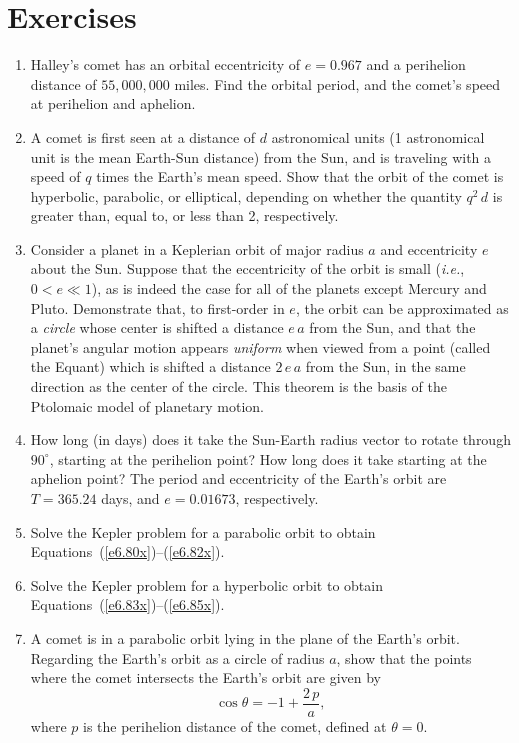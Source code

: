 \section{Exercises}
{\small
\renewcommand{\theenumi}{5.\arabic{enumi}}
\begin{enumerate}
\item Halley's comet has an orbital eccentricity of $e=0.967$ and a perihelion
distance of $55,000,000$ miles. Find the orbital period, and the comet's speed at
perihelion and aphelion.
\item A comet is first seen at a distance of $d$ astronomical units (1 astronomical unit is the mean Earth-Sun distance) from the Sun, and
is traveling with a speed of $q$ times the Earth's mean speed. Show that the orbit of the
comet is hyperbolic, parabolic, or elliptical, depending on whether the quantity $q^2\,d$ is
greater than, equal to, or less than 2, respectively.
\item Consider a planet in a Keplerian orbit of major radius $a$ and
eccentricity $e$ about the Sun. Suppose that the eccentricity of the orbit is small
({\em i.e.}, $0<e\ll 1$), as is indeed the case for all of the planets except Mercury
and Pluto. Demonstrate that, to first-order in $e$, the orbit can be approximated as a {\em circle}\/ whose center is shifted a distance $e\,a$ from
the Sun, and that the planet's angular motion appears {\em uniform}\/ when
viewed from a point (called the Equant) which is shifted a distance
$2\,e\,a$ from the Sun, in the same direction as the center of the circle.
This theorem is the
basis of the Ptolomaic model of planetary motion. 
\item How long (in days) does it take the Sun-Earth  radius vector to
rotate through $90^\circ$, starting at the perihelion point? How long does it take starting at the aphelion point? The period and eccentricity of the Earth's orbit are $T=365.24$ days, and $e=0.01673$, respectively.
\item Solve the Kepler problem for a parabolic orbit to obtain  Equations~(\ref{e6.80x})--(\ref{e6.82x}).
\item Solve the Kepler problem for a hyperbolic orbit to obtain Equations~(\ref{e6.83x})--(\ref{e6.85x}).
\item A comet is in a parabolic orbit lying in the plane of the Earth's
orbit. Regarding the Earth's orbit as a circle of radius $a$, show that the points
where the comet intersects the Earth's orbit are given by
$$
\cos\theta = -1 + \frac{2\,p}{a},
$$
where $p$ is the perihelion distance of the comet, defined at $\theta=0$. 

\end{enumerate}}
